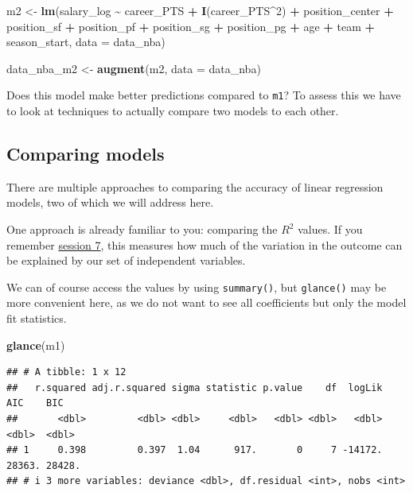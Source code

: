 \documentclass[
]{book}
\newenvironment{Shaded}{\begin{snugshade}}{\end{snugshade}}
\newcommand{\AttributeTok}[1]{\textcolor[rgb]{0.13,0.29,0.53}{#1}}
\newcommand{\DecValTok}[1]{\textcolor[rgb]{0.00,0.00,0.81}{#1}}
\newcommand{\FunctionTok}[1]{\textcolor[rgb]{0.13,0.29,0.53}{\textbf{#1}}}
\newcommand{\NormalTok}[1]{#1}
\newcommand{\OtherTok}[1]{\textcolor[rgb]{0.56,0.35,0.01}{#1}}
\newcommand{\SpecialCharTok}[1]{\textcolor[rgb]{0.81,0.36,0.00}{\textbf{#1}}}
\begin{document}
\begin{Shaded}
\begin{Highlighting}[]
\NormalTok{m2 }\OtherTok{\textless{}{-}} \FunctionTok{lm}\NormalTok{(salary\_log }\SpecialCharTok{\textasciitilde{}}\NormalTok{ career\_PTS }\SpecialCharTok{+} \FunctionTok{I}\NormalTok{(career\_PTS}\SpecialCharTok{\^{}}\DecValTok{2}\NormalTok{) }\SpecialCharTok{+} 
\NormalTok{           position\_center }\SpecialCharTok{+}\NormalTok{ position\_sf }\SpecialCharTok{+}\NormalTok{ position\_pf }\SpecialCharTok{+}\NormalTok{ position\_sg }\SpecialCharTok{+}\NormalTok{ position\_pg }\SpecialCharTok{+}
\NormalTok{           age }\SpecialCharTok{+}\NormalTok{ team }\SpecialCharTok{+}\NormalTok{ season\_start,}
         \AttributeTok{data =}\NormalTok{ data\_nba)}

\NormalTok{data\_nba\_m2 }\OtherTok{\textless{}{-}} \FunctionTok{augment}\NormalTok{(m2, }\AttributeTok{data =}\NormalTok{ data\_nba)}
\end{Highlighting}
\end{Shaded}

Does this model make better predictions compared to \texttt{m1}? To assess this we have
to look at techniques to actually compare two models to each other.

\hypertarget{comparing-models}{%
\subsection{Comparing models}\label{comparing-models}}

There are multiple approaches to comparing the accuracy of linear regression
models, two of which we will address here.

One approach is already familiar to you: comparing the \(R^2\) values.
If you remember \protect\hyperlink{lin-t-3}{session 7}, this measures how much of the variation
in the outcome can be explained by our set of independent variables.

We can of course access the values by using \texttt{summary()}, but \texttt{glance()} may be
more convenient here, as we do not want to see all coefficients but only the
model fit statistics.

\begin{Shaded}
\begin{Highlighting}[]
\FunctionTok{glance}\NormalTok{(m1)}
\end{Highlighting}
\end{Shaded}

\begin{verbatim}
## # A tibble: 1 x 12
##   r.squared adj.r.squared sigma statistic p.value    df  logLik    AIC    BIC
##       <dbl>         <dbl> <dbl>     <dbl>   <dbl> <dbl>   <dbl>  <dbl>  <dbl>
## 1     0.398         0.397  1.04      917.       0     7 -14172. 28363. 28428.
## # i 3 more variables: deviance <dbl>, df.residual <int>, nobs <int>
\end{verbatim}
\end{document}
